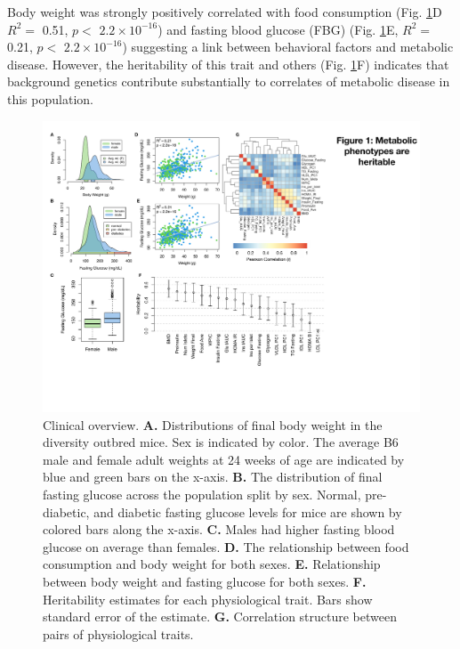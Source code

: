 \documentclass[
]{article}
\begin{document}
Body weight was strongly positively correlated with food consumption
(Fig. \ref{fig:trait_overview}D \(R^2 =\) 0.51, \(p<\)
\ensuremath{2.2\times 10^{-16}}) and fasting blood glucose (FBG) (Fig.
\ref{fig:trait_overview}E, \(R^2=\) 0.21, \(p <\)
\ensuremath{2.2\times 10^{-16}}) suggesting a link between behavioral
factors and metabolic disease. However, the heritability of this trait
and others (Fig. \ref{fig:trait_overview}F) indicates that background
genetics contribute substantially to correlates of metabolic disease in
this population.

\begin{figure}[ht!]
\includegraphics[width=\textwidth]{Figures/Fig1_trait_overview.pdf} 
\caption{Clinical overview. \textbf{A.} Distributions of final body weight 
in the diversity outbred mice. Sex is indicated by color. The 
average B6 male and female adult weights at 24 weeks of age 
are indicated by blue and green bars on the x-axis. \textbf{B.} The 
distribution of final fasting glucose across the population split 
by sex. Normal, pre-diabetic, and diabetic fasting glucose levels 
for mice are shown by colored bars along the x-axis. \textbf{C.} Males had 
higher fasting blood glucose on average than females. \textbf{D.} The 
relationship between food consumption and body weight for both 
sexes. \textbf{E.} Relationship between body weight and fasting glucose 
for both sexes. \textbf{F.} Heritability estimates for each physiological 
trait. Bars show standard error of the estimate. \textbf{G.} Correlation 
structure between pairs of physiological traits.}
\label{fig:trait_overview}
\end{figure}
\end{document}
